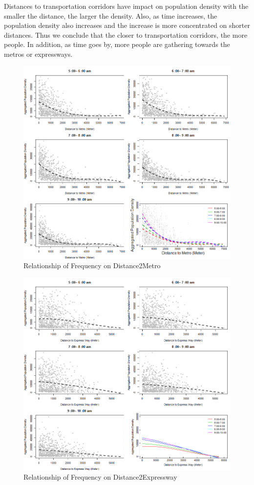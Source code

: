 \documentclass[hidelinks,12pt]{article}
\begin{document}
	Distances to transportation corridors have impact on population density with the smaller the distance, the larger the density. Also, as time increases, the population density also increases and the increase is more concentrated on shorter distances. Thus we conclude that the closer to transportation corridors, the more people. In addition, as time goes by, more people are gathering towards the metros or expressways.
	\begin{figure}[!ht]
		\includegraphics[width=\textwidth,height=0.45\textheight]{dist2metro.png}
		\caption{Relationship of Frequency on Distance2Metro \label{fig:disme}}
	\end{figure}
\FloatBarrier
	\begin{figure}[!ht]
		\includegraphics[width=\textwidth,height=0.45\textheight]{dist2express.png}
		\caption{Relationship of Frequency on Distance2Expressway \label{fig:disex}}
	\end{figure}
\FloatBarrier
	
\end{document}
